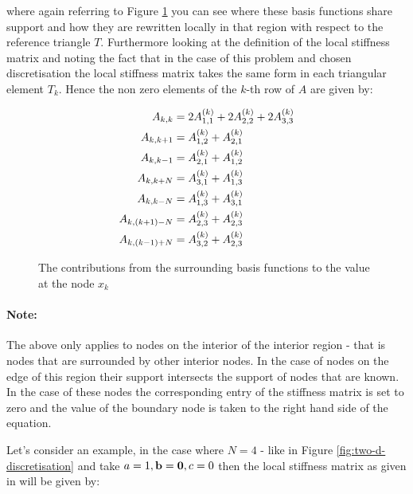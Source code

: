 where again referring to Figure \ref{fig:twod-global-basis-contrib} you can see
where these basis functions share support and how they are rewritten locally in
that region with respect to the reference triangle $T$. Furthermore looking at
the definition of the local stiffness matrix 
and noting the fact that in the case of this problem and chosen discretisation
the local stiffness matrix takes the same form in each triangular element
$T_k$. Hence the non zero elements of the $k$-th row of $A$ are given by:

\begin{align}
  \begin{split}
    A_{k,k} &= 2A^{(k)}_{1,1} + 2A^{(k)}_{2,2} + 2A^{(k)}_{3,3} \\
    A_{k,k+1} &= A^{(k)}_{1,2} + A^{(k)}_{2,1} \\
    A_{k,k-1} &= A^{(k)}_{2,1} + A^{(k)}_{1,2} \\
    A_{k,k+N} &= A^{(k)}_{3,1} + A^{(k)}_{1,3} \\
    A_{k,k-N} &= A^{(k)}_{1,3} + A^{(k)}_{3,1} \\
    A_{k,(k+1)-N} &= A^{(k)}_{2,3} + A^{(k)}_{2,3} \\
    A_{k,(k-1)+N} &= A^{(k)}_{3,2} + A^{(k)}_{2,3}
  \end{split}
\end{align}

\begin{figure}
    \centering
    
    \caption{The contributions from the surrounding basis functions to the
        value at the node $x_k$}
    \label{fig:twod-global-basis-contrib}
\end{figure}

\paragraph{Note:}

The above only applies to nodes on the interior of the interior region - that
is nodes that are surrounded by other interior nodes. In the case of nodes on
the edge of this region their support intersects the support of nodes that are
known. In the case of these nodes the corresponding entry of the stiffness
matrix is set to zero and the value of the boundary node is taken to the right
hand side of the equation.

Let's consider an example, in the case where $N = 4$ - like in Figure
\ref{fig:two-d-discretisation} and take $a = 1, \mathbf{b} = \mathbf{0}, c = 0$
then the local stiffness matrix as given in
 will be given by:

